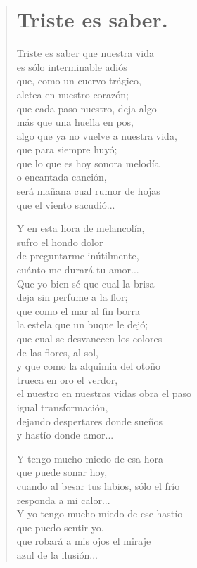 \documentclass[11pt, portrait, twoside, notitlepage, openright]{book}
\begin{document}
\newpage
\begin{verse}
\begin{center}
\section{Triste es saber.}
\end{center}
Triste es saber que nuestra vida\\
es sólo interminable adiós\\
que, como un cuervo trágico,\\
aletea en nuestro corazón;\\
que cada paso nuestro, deja algo\\
más que una huella en pos,\\
algo que ya no vuelve a nuestra vida,\\
que para siempre huyó;\\
que lo que es hoy sonora melodía\\
o encantada canción,\\
será mañana cual rumor de hojas\\
que el viento sacudió...
\newline

Y en esta hora de melancolía,\\
sufro el hondo dolor\\
de preguntarme inútilmente,\\
cuánto me durará tu amor...\\
Que yo bien sé que cual la brisa\\
deja sin perfume a la flor;\\
que como el mar al fin borra\\
la estela que un buque le dejó;\\
que cual se desvanecen los colores\\
de las flores, al sol,\\
y que como la alquimia del otoño\\
trueca en oro el verdor,\\
el nuestro en nuestras vidas obra el paso\\
igual transformación,\\
dejando despertares donde sueños\\
y hastío donde amor...
\newline

Y tengo mucho miedo de esa hora\\
que puede sonar hoy,\\
cuando al besar tus labios, sólo el frío\\
responda a mi calor...\\
Y yo tengo mucho miedo de ese hastío\\
que puedo sentir yo.\\
que robará a mis ojos el miraje\\
azul de la ilusión...
\newline


\end{verse}
\end{document}
